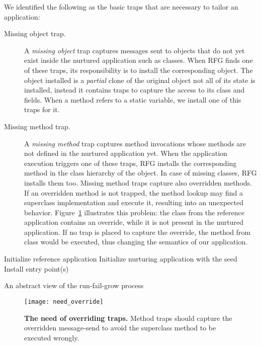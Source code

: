 We identified the following as the basic traps that are necessary to tailor an application:

\begin{description}
\item[Missing object trap.] A \emph{missing object} trap captures messages sent to objects that do not yet exist inside the nurtured application such as classes. When RFG finds one of these traps, its responsibility is to install the corresponding object. The object installed is a \emph{partial} clone of the original object \ie not all of its state is installed, instead it contains traps to capture the access to its class and fields. When a method refers to a static variable, we install one of this traps for it.

\item[Missing method trap.] A \emph{missing method} trap captures me\-thod invocations whose methods are not defined in the nurtured application yet. When the application execution triggers one of these traps, RFG installs the corresponding method in the class hierarchy of the object. In case of missing classes, RFG installs them too. Missing method traps capture also overridden methods. If an overridden method is not trapped, the method lookup may find a superclass implementation and execute it, resulting into an unexpected behavior. Figure~\ref{fig:need_override} illustrates this problem: the class  from the reference application contains an override, while it is not present in the nurtured application. If no trap is placed to capture the override, the method  from class  would be executed, thus changing the semantics of our application.

\end{description}

\begin{algorithm}[ht]
 Initialize reference application\;
 Initialize nurturing application with the seed\;
 Install entry point(s)\;
 \caption{\small An abstract view of the run-fail-grow process \label{alg:tailoring_process}}
\end{algorithm}


\begin{figure}[ht]
\begin{center}
\texttt{[image: need\_override]}
\caption{\small\textbf{The need of overriding traps.} \small Method traps should capture the overridden  message-send to avoid the superclass method to be executed wrongly.\label{fig:need_override}}
\end{center}
\end{figure}



